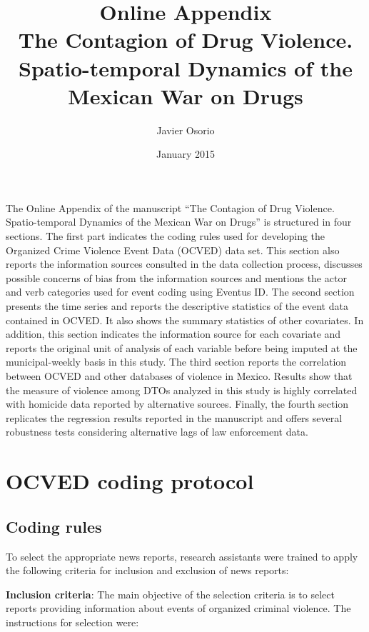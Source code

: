 \documentclass[12pt,letterpaper]{article}
\title{ Online Appendix   \\ The Contagion of Drug Violence. Spatio-temporal Dynamics of the Mexican War on Drugs}
\author{Javier Osorio}
\date{January 2015}
\begin{document}
\maketitle


The Online Appendix of the manuscript ``The Contagion of Drug Violence. Spatio-temporal Dynamics of the Mexican War on Drugs'' is structured in four sections.  The first part indicates the coding rules used for developing the Organized Crime Violence Event Data (OCVED) data set. This section also reports the information sources consulted in the data collection process, discusses possible concerns of bias from the information sources and mentions the actor and verb categories used for event coding using Eventus ID. The second section presents the time series and reports the descriptive statistics of the event data contained in OCVED. It also shows the summary statistics of other covariates. In addition, this section indicates the information source for each covariate and reports the original unit of analysis of each variable before being imputed at the municipal-weekly basis in this study. The third section reports the correlation between OCVED and other databases of violence in Mexico. Results show that the measure of violence among DTOs analyzed in this study is highly correlated with homicide data reported by alternative sources. Finally, the fourth section replicates the regression results reported in the manuscript and offers several robustness tests considering alternative lags of law enforcement data.  




\section{OCVED coding protocol}



\subsection{Coding rules}

To select the appropriate news reports, research assistants were trained to apply the following criteria for inclusion and exclusion of news reports:

\textbf{Inclusion criteria}: The main objective of the selection criteria is to select reports providing information about events of organized criminal violence. The instructions for selection were:
\end{document}
